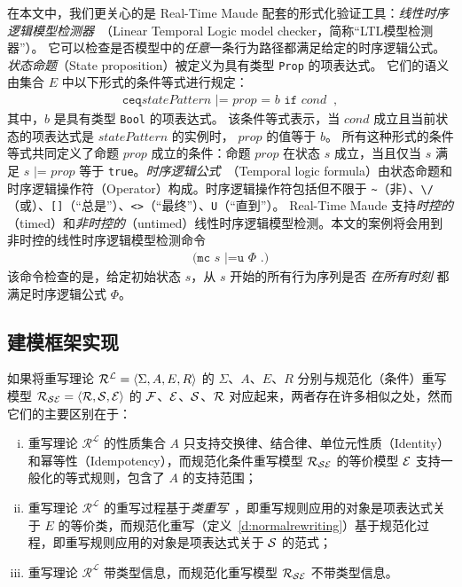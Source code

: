 在本文中，我们更关心的是 Real-Time Maude 配套的形式化验证工具：\emph{线性时序逻辑模型检测器}~\cite{clarke1999model}（Linear Temporal Logic model checker，简称“LTL模型检测器”）。
它可以检查是否模型中的\emph{任意}一条行为路径都满足给定的时序逻辑公式。
\emph{状态命题}（State proposition）被定义为具有类型 \verb|Prop| 的项表达式。
它们的语义由集合 $\mathit{E}$ 中以下形式的条件等式进行规定：
\begin{eqnarray}
\texttt{ceq
} \mathit{statePattern} \texttt{ |= } \mathit{prop} \texttt{ = } b
\texttt{ if } cond\;\; , \nonumber
\end{eqnarray}
其中，$b$ 是具有类型 \verb|Bool| 的项表达式。
该条件等式表示，当 $cond$ 成立且当前状态的项表达式是 $\mathit{statePattern}$ 的实例时， $\mathit{prop}$ 的值等于 $b$。
所有这种形式的条件等式共同定义了命题 $\mathit{prop}$ 成立的条件：命题 $\mathit{prop}$ 在状态 $s$ 成立，当且仅当 $s$ 满足 $s \texttt{ |= } \mathit{prop}$ 等于 \verb|true|。\emph{时序逻辑公式}~\cite{DBLP:books/daglib/0077033}（Temporal logic formula）由状态命题和时序逻辑操作符（Operator）构成。时序逻辑操作符包括但不限于 \verb|~|（非）、\verb|\/|（或）、\verb|[]|（“总是”）、\verb|<>|（“最终”）、\verb|U|（“直到”）。 Real-Time Maude 支持\emph{时控的}（timed）和\emph{非时控的}（untimed）线性时序逻辑模型检测。本文的案例将会用到非时控的线性时序逻辑模型检测命令
\begin{eqnarray}
  \texttt{(mc } s \texttt{ |=u } \Phi \texttt{ .)} \nonumber
\end{eqnarray}
该命令检查的是，给定初始状态 $s$，从 $s$ 开始的所有行为序列是否 \emph{在所有时刻} 都满足时序逻辑公式 $\Phi$。


\subsection{建模框架实现} 

如果将重写理论 $\mathcal{R^L} = \langle \Sigma, A, E, R\rangle$ 的 $\Sigma$、$A$、$E$、$R$ 分别与规范化（条件）重写模型 $\mathcal{R}_{\mathcal{S}\mathcal{E}} = \langle \mathcal{R},\mathcal{S},\mathcal{E}\rangle$ 的 $\mathcal{F}$、$\mathcal{E}$、$\mathcal{S}$、$\mathcal{R}$ 对应起来，两者存在许多相似之处，然而它们的主要区别在于：
\begin{enumerate}[(i)]
\item 重写理论 $\mathcal{R^L}$ 的性质集合 $A$ 只支持交换律、结合律、单位元性质（Identity）和幂等性（Idempotency），而规范化条件重写模型 $\mathcal{R}_{\mathcal{S}\mathcal{E}}$ 的等价模型 $\mathcal{E}$ 支持一般化的等式规则，包含了 $A$ 的支持范围；
\item 重写理论 $\mathcal{R^L}$ 的重写过程基于\emph{类重写}~\cite{lankford77b}，即重写规则应用的对象是项表达式关于 $E$ 的等价类，而规范化重写（定义~\ref{d:normalrewriting}）基于规范化过程，即重写规则应用的对象是项表达式关于 $\mathcal{S}$ 的范式；
\item 重写理论 $\mathcal{R^L}$ 带类型信息，而规范化重写模型 $\mathcal{R}_{\mathcal{S}\mathcal{E}}$ 不带类型信息。
\end{enumerate}

